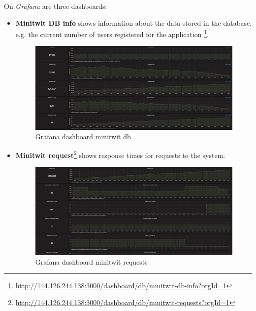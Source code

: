 On \textit{Grafana} are three dashboards:
\begin{itemize}
    \item \textbf{Minitwit DB info} shows information about the data stored in the database, e.g. the current number of users registered for the application \footnote{\url{http://144.126.244.138:3000/dashboard/db/minitwit-db-info?orgId=1}}.
    \begin{figure}[H]
        \centering
        \includegraphics[width=1.0\textwidth]{images/Grafana_minitwit_db.JPG}
        \caption{Grafana dashboard minitwit db}
        \label{fig:grafana_db}
    \end{figure}
    
    \item \textbf{Minitwit request}\footnote{\url{http://144.126.244.138:3000/dashboard/db/minitwit-requests?orgId=1}} shows response times for requests to the system.
    \begin{figure}[H]
        \centering
        \includegraphics[width=1.0\textwidth]{images/Grafana_minitwit_requests.JPG}
        \caption{Grafana dashboard minitwit requests}
        \label{fig:grafana_requests}
    \end{figure}
    

\end{itemize}
